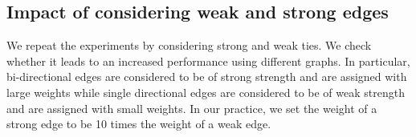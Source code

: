 \documentclass[acmtweb]{acmsmall}
\begin{document}
\begin{figure}[thbp!]
\end{figure}

\subsection{Impact of considering weak and strong edges} \label{sec:tiestrength}
We repeat the experiments by considering strong and weak ties. We
check whether it leads to an increased performance using different
graphs. In particular, bi-directional edges are considered to be of
strong strength and are assigned with large weights while single
directional edges are considered to be of weak strength and are
assigned with small weights. In our practice, we set the weight of a
strong edge to be 10 times the weight of a weak edge. 
\end{document}
